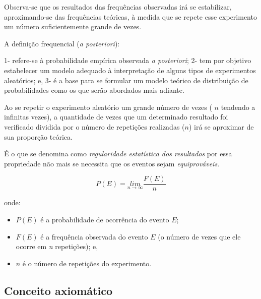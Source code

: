 \documentclass[
]{book}
\providecommand{\tightlist}{%
  \setlength{\itemsep}{0pt}\setlength{\parskip}{0pt}}
\begin{document}
\hfill\break

Observa-se que os resultados das frequências observadas irá se estabilizar, aproximando-se das frequências teóricas, à medida que se repete esse experimento um número suficientemente grande de vezes.

\hfill\break

A definição frequencial (\emph{a posteriori}):

\hfill\break

1- refere-se à probabilidade empírica observada \emph{a posteriori};
2- tem por objetivo estabelecer um modelo adequado à interpretação de alguns tipos de experimentos aleatórios; e,
3- é a base para se formular um modelo teórico de distribuição de probabilidades como os que serão abordados mais adiante.

\hfill\break

Ao se repetir o experimento aleatório um grande número de vezes ( \(n\) tendendo a infinitas vezes), a quantidade de vezes que um determinado resultado foi verificado dividida por o número de repetições realizadas (\(n\)) irá se aproximar de sua proporção teórica.

\hfill\break

É o que se denomina como \emph{regularidade estatística dos resultados} por essa propriedade não mais se necessita que os eventos sejam \emph{equiprováveis}.

\hfill\break

\[
P\left(E\right)=\underset{n\to \infty }{lim}{\frac{F(E)}{n}}
\]

\hfill\break

onde:

\hfill\break

\begin{itemize}
\tightlist
\item
  \(P(E)\) é a probabilidade de ocorrência do evento \(E\);\\
\item
  \(F(E)\) é a frequência observada do evento \(E\) (o número de vezes que ele ocorre em \emph{n} repetições); e,\\
\item
  \(n\) é o número de repetições do experimento.
\end{itemize}

\hfill\break

\hfill\break

\hypertarget{conceito-axiomuxe1tico}{%
\subsection{Conceito axiomático}\label{conceito-axiomuxe1tico}}
\end{document}
